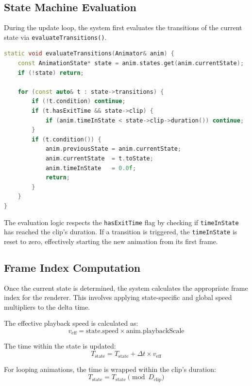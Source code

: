 \subsection{State Machine Evaluation}

During the update loop, the system first evaluates the transitions of the current state via \texttt{evaluateTransitions()}.

\begin{lstlisting}[language=C++]
static void evaluateTransitions(Animator& anim) {
    const AnimationState* state = anim.states.get(anim.currentState);
    if (!state) return;

    for (const auto& t : state->transitions) {
        if (!t.condition) continue;
        if (t.hasExitTime && state->clip) {
            if (anim.timeInState < state->clip->duration()) continue;
        }
        if (t.condition()) {
            anim.previousState = anim.currentState;
            anim.currentState  = t.toState;
            anim.timeInState   = 0.0f;
            return;
        }
    }
}
\end{lstlisting}

The evaluation logic respects the \texttt{hasExitTime} flag by checking if \texttt{timeInState} has reached the clip's duration. If a transition is triggered, the \texttt{timeInState} is reset to zero, effectively starting the new animation from its first frame.

\subsection{Frame Index Computation}

Once the current state is determined, the system calculates the appropriate frame index for the renderer. This involves applying state-specific and global speed multipliers to the delta time.

The effective playback speed is calculated as:
\begin{equation}
v_{\text{eff}} = \text{state.speed} \times \text{anim.playbackScale}
\end{equation}

The time within the state is updated:
\begin{equation}
T_{\text{state}} = T_{\text{state}} + \Delta t \times v_{\text{eff}}
\end{equation}

For looping animations, the time is wrapped within the clip's duration:
\begin{equation}
T_{\text{state}} = T_{\text{state}} \pmod{D_{\text{clip}}}
\end{equation}


